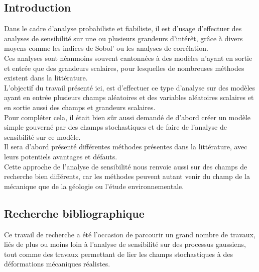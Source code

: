 \documentclass[a4paper,10pt]{article}
\begin{document}
\subsection{Introduction}
Dans le cadre d'analyse probabiliste et fiabiliste, il est d'usage d’effectuer des analyses de sensibilité sur une ou plusieurs grandeurs d’intérêt, grâce à divers moyens comme les indices de Sobol' ou les analyses de corrélation. \\
Ces analyses sont néanmoins souvent cantonnées à des modèles n'ayant en sortie et entrée que des grandeurs scalaires, pour lesquelles de nombreuses méthodes existent dans la littérature.\\
L'objectif du travail présenté ici, est d’effectuer ce type d'analyse sur des modèles ayant en entrée plusieurs champs aléatoires et des variables aléatoires scalaires et en sortie aussi des champs et grandeurs scalaires. \\ Pour compléter cela, il était bien sûr aussi demandé de d'abord créer un modèle simple gouverné par des champs stochastiques et de faire de l'analyse de sensibilité sur ce modèle. \\
Il sera d'abord présenté différentes méthodes présentes dans la littérature, avec leurs potentiels avantages et défauts. \\ 
Cette approche de l'analyse de sensibilité nous renvoie aussi sur des champs de recherche bien différents, car les méthodes peuvent autant venir du champ de la mécanique que de la géologie ou l'étude environnementale.

 
\subsection{Recherche bibliographique}
Ce travail de recherche a été l'occasion de parcourir un grand nombre de travaux, liés de plus ou moins loin à l'analyse de sensibilité sur des processus gaussiens, tout comme des travaux permettant de lier les champs stochastiques à des déformations mécaniques réalistes.\par \smallskip
\end{document}

